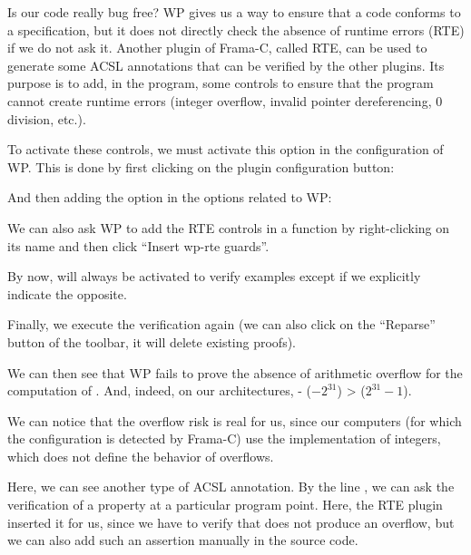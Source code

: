 Is our code really bug free? WP gives us a way to ensure that a code
conforms to a specification, but it does not directly check the absence
of runtime errors (RTE) if we do not ask it. Another plugin of Frama-C,
called RTE, can be used to generate some ACSL annotations that can be verified
by the other plugins. Its purpose is to add, in the program, some controls to
ensure that the program cannot create runtime errors (integer overflow,
invalid pointer dereferencing, 0 division, etc.).



To activate these controls, we must activate this option in the configuration
of WP. This is done by first clicking on the plugin configuration button:




And then adding the option  in the options related to WP:




We can also ask WP to add the RTE controls in a function by
right-clicking on its name and then click ``Insert wp-rte guards''.


\begin{Information}
  By now,  will always be activated to verify examples
  except if we explicitly indicate the opposite.
\end{Information}


Finally, we execute the verification again (we can also click on the
``Reparse'' button of the toolbar, it will delete existing proofs).

We can then see that WP fails to prove the absence of arithmetic
overflow for the computation of . And, indeed, on our
architectures, - ($-2^{31}$) >  ($2^{31}-1$).





\begin{Information}
We can notice that the overflow risk
is real for us, since our computers (for which the
configuration is detected by Frama-C) use the
implementation of integers, which does not define
the behavior of overflows.
\end{Information}


Here, we can see another type of ACSL annotation. By the line
, we can ask the verification of a
property at a particular program point. Here, the RTE plugin inserted it for
us, since
we have to verify that  does not produce an overflow, but
we can also add such an assertion manually in the source code.



